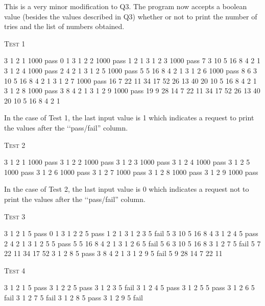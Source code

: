 This is a very minor modification to Q3. 
The program now accepts a boolean value (besides the values described in Q3) 
whether or not to print the number of tries and the list of numbers obtained.

\textsc{Test 1}
\begin{console}[frame=single,fontsize=\footnotesize, commandchars=\\\{\}]
3 1 2 1 1000 pass 0 1
3 1 2 2 1000 pass 1 2 1
3 1 2 3 1000 pass 7 3 10 5 16 8 4 2 1
3 1 2 4 1000 pass 2 4 2 1
3 1 2 5 1000 pass 5 5 16 8 4 2 1
3 1 2 6 1000 pass 8 6 3 10 5 16 8 4 2 1
3 1 2 7 1000 pass 16 7 22 11 34 17 52 26 13 40 20 10 5 16 8 4 2 1
3 1 2 8 1000 pass 3 8 4 2 1
3 1 2 9 1000 pass 19 9 28 14 7 22 11 34 17 52 26 13 40 20 10 5 16 8 4 2 1
\end{console}

In the case of Test 1, 
the last input value is 1 which indicates a request to print the values after 
the \lq\lq pass/fail'' column.


\textsc{Test 2}
\begin{console}[frame=single,fontsize=\footnotesize, commandchars=\\\{\}]
3 1 2 1 1000 pass
3 1 2 2 1000 pass
3 1 2 3 1000 pass
3 1 2 4 1000 pass
3 1 2 5 1000 pass
3 1 2 6 1000 pass
3 1 2 7 1000 pass
3 1 2 8 1000 pass
3 1 2 9 1000 pass
\end{console}
In the case of Test 2, 
the last input value is 0 which indicates a request not to print the 
values after the \lq\lq pass/fail'' column.

\textsc{Test 3}
\begin{console}[frame=single,fontsize=\footnotesize, commandchars=\\\{\}]
3 1 2 1 5 pass 0 1
3 1 2 2 5 pass 1 2 1
3 1 2 3 5 fail 5 3 10 5 16 8 4
3 1 2 4 5 pass 2 4 2 1
3 1 2 5 5 pass 5 5 16 8 4 2 1
3 1 2 6 5 fail 5 6 3 10 5 16 8
3 1 2 7 5 fail 5 7 22 11 34 17 52
3 1 2 8 5 pass 3 8 4 2 1
3 1 2 9 5 fail 5 9 28 14 7 22 11
\end{console}

\textsc{Test 4}
\begin{console}[frame=single,fontsize=\footnotesize,commandchars=\\\{\}]
3 1 2 1 5 pass
3 1 2 2 5 pass
3 1 2 3 5 fail
3 1 2 4 5 pass
3 1 2 5 5 pass
3 1 2 6 5 fail
3 1 2 7 5 fail
3 1 2 8 5 pass
3 1 2 9 5 fail
\end{console}




